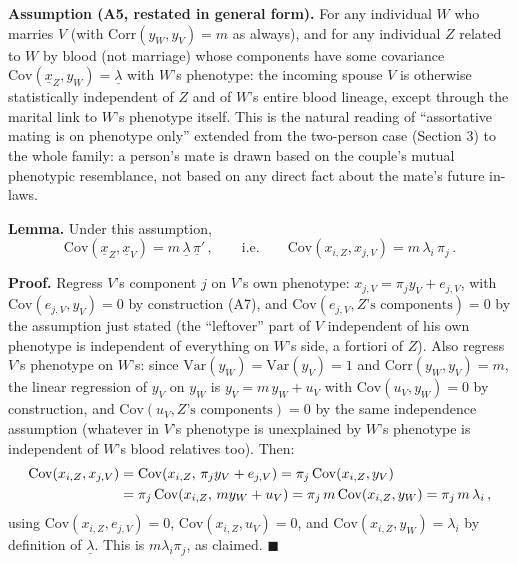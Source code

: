 \documentclass[12pt]{article}
\begin{document}
\textbf{Assumption (A5, restated in general form).} For any individual $W$ who marries $V$ (with $\mathrm{Corr}(y_W,y_V)=m$ as always), and for any individual $Z$ related to $W$ by blood (not marriage) whose components have some covariance $\mathrm{Cov}(\underline x_Z,y_W)=\underline\lambda$ with $W$'s phenotype: the incoming spouse $V$ is otherwise statistically independent of $Z$ and of $W$'s entire blood lineage, except through the marital link to $W$'s phenotype itself. This is the natural reading of ``assortative mating is on phenotype only'' extended from the two-person case (Section 3) to the whole family: a person's mate is drawn based on the couple's mutual phenotypic resemblance, not based on any direct fact about the mate's future in-laws.

\textbf{Lemma.} Under this assumption,
\begin{equation}
\mathrm{Cov}(\underline x_Z,\underline x_V) = m\,\underline\lambda\,\underline\pi' \, , \qquad \text{i.e.} \qquad \mathrm{Cov}(x_{i,Z},x_{j,V}) = m\,\lambda_i\,\pi_j \, .
\end{equation}

\textbf{Proof.} Regress $V$'s component $j$ on $V$'s own phenotype: $x_{j,V}=\pi_jy_V+e_{j,V}$, with $\mathrm{Cov}(e_{j,V},y_V)=0$ by construction (A7), and $\mathrm{Cov}(e_{j,V},Z\text{'s components})=0$ by the assumption just stated (the ``leftover'' part of $V$ independent of his own phenotype is independent of everything on $W$'s side, a fortiori of $Z$). Also regress $V$'s phenotype on $W$'s: since $\mathrm{Var}(y_W)=\mathrm{Var}(y_V)=1$ and $\mathrm{Corr}(y_W,y_V)=m$, the linear regression of $y_V$ on $y_W$ is $y_V=m\,y_W+u_V$ with $\mathrm{Cov}(u_V,y_W)=0$ by construction, and $\mathrm{Cov}(u_V,Z\text{'s components})=0$ by the same independence assumption (whatever in $V$'s phenotype is unexplained by $W$'s phenotype is independent of $W$'s blood relatives too). Then:
\begin{align}
\mathrm{Cov}(x_{i,Z},x_{j,V}) &= \mathrm{Cov}(x_{i,Z},\,\pi_jy_V+e_{j,V}) = \pi_j\,\mathrm{Cov}(x_{i,Z},y_V) \notag \\
&= \pi_j\,\mathrm{Cov}(x_{i,Z},\,my_W+u_V) = \pi_j\,m\,\mathrm{Cov}(x_{i,Z},y_W) = \pi_j\,m\,\lambda_i \, ,
\end{align}
using $\mathrm{Cov}(x_{i,Z},e_{j,V})=0$, $\mathrm{Cov}(x_{i,Z},u_V)=0$, and $\mathrm{Cov}(x_{i,Z},y_W)=\lambda_i$ by definition of $\underline\lambda$. This is $m\lambda_i\pi_j$, as claimed. $\blacksquare$
\end{document}
